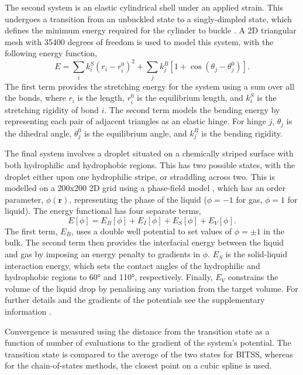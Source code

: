 \documentclass[aps,prl,twocolumn,10pt,groupedaddress]{revtex4-2}
\begin{document}
The second system is an elastic cylindrical shell under an applied strain.
This undergoes a transition from an unbuckled state to a singly-dimpled state, which defines the minimum energy required for the cylinder to buckle \cite{Panter2019}.
A 2D triangular mesh with 35400 degrees of freedom is used to model this system, with the following energy function,
\begin{equation}
  E = \sum_i k^S_i (r_i - r^0_i)^2 + \sum_j k^B_j [1 + \cos(\theta_j - \theta^0_j)].
\end{equation}
The first term provides the stretching energy for the system using a sum over all the bonds, where $r_i$ is the length, $r^0_i$ is the equilibrium length, and $k^S_i$ is the stretching rigidity of bond $i$.
The second term models the bending energy by representing each pair of adjacent triangles as an elastic hinge.
For hinge $j$, $\theta_j$ is the dihedral angle, $\theta^0_j$ is the equilibrium angle, and $k^B_j$ is the bending rigidity.

The final system involves a droplet situated on a chemically striped surface with both hydrophilic and hydrophobic regions.
This has two possible states, with the droplet either upon one hydrophilic stripe, or straddling across two.
This is modelled on a 200x200 2D grid using a phase-field model \cite{Panter2019b}, which has an order parameter, $\phi(\bm{r})$, representing the phase of the liquid ($\phi=-1$ for gas, $\phi=1$ for liquid).
The energy functional has four separate terms,
\begin{equation} \label{eq:phasefield}
  E[\phi] = E_B[\phi] + E_I[\phi] + E_S[\phi] + E_V[\phi].
\end{equation}
The first term, $E_B$, uses a double well potential to set values of $\phi=\pm1$ in the bulk.
The second term then provides the interfacial energy between the liquid and gas by imposing an energy penalty to gradients in $\phi$.
$E_S$ is the solid-liquid interaction energy, which sets the contact angles of the hydrophilic and hydrophobic regions to 60\si{\degree} and 110\si{\degree}, respectively.
Finally, $E_V$ constrains the volume of the liquid drop by penalising any variation from the target volume.
For further details and the gradients of the potentials see the supplementary information \cite{Note1}.

Convergence is measured using the distance from the transition state as a function of number of evaluations to the gradient of the system's potential.
The transition state is compared to the average of the two states for BITSS, whereas for the chain-of-states methods, the closest point on a cubic spline is used.
\end{document}
